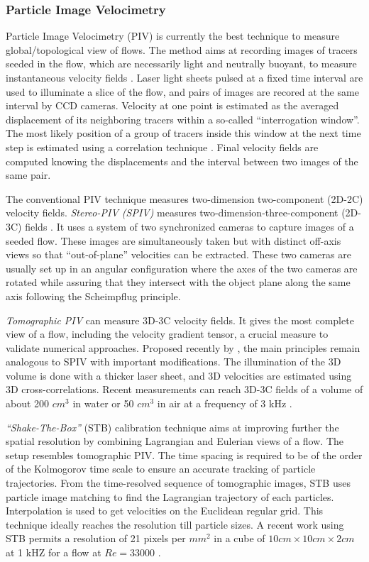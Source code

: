 \subsubsection{Particle Image Velocimetry}  
Particle Image Velocimetry (PIV) is currently the best technique to measure global/topological view of flows. The method aims at recording images of tracers seeded in the flow, which are necessarily light and neutrally buoyant, to measure instantaneous velocity fields \citep{adrian2005twenty,keane1992theory}. Laser light sheets pulsed at a fixed time interval are used to  illuminate a slice of the flow, and pairs of images are recored at the same interval by CCD cameras. Velocity at one point is estimated as the averaged displacement of its neighboring tracers within a so-called ``interrogation window''. The most likely position of a group of tracers inside this window at the next time step is estimated using a correlation technique \citep{sutton1983determination}. Final velocity fields are computed knowing the displacements and the interval between two images of the same pair.

The conventional PIV technique measures two-dimension two-component (2D-2C) velocity fields. \textit{Stereo-PIV (SPIV)} measures two-dimension-three-component (2D-3C) fields \citep{prasad2000stereoscopic}. It uses a system of two synchronized cameras to capture images of a seeded flow. These images are simultaneously taken but with distinct off-axis views so that ``out-of-plane'' velocities can be extracted. These two cameras are usually set up in an angular configuration where the axes of the two cameras are rotated while assuring that they intersect with the object plane along the same axis following the Scheimpflug principle.

\textit{Tomographic PIV} can measure 3D-3C velocity fields. It gives the most complete view of a flow, including the velocity gradient tensor, a crucial measure to validate numerical approaches. Proposed recently by \citet{elsinga2005assessment,elsinga2006tomographic}, the main principles remain analogous to SPIV with important modifications. The illumination of the 3D volume is done with a thicker laser sheet, and 3D velocities are estimated using 3D cross-correlations. Recent measurements can reach 3D-3C fields of a volume of about 200 $ cm^3 $ in water or 50 $ cm^3 $ in air at a frequency of 3 kHz \citep{scarano2013tomographic}. 

\textit{``Shake-The-Box''} (STB) calibration technique aims at improving further the spatial resolution by combining Lagrangian and Eulerian views of a flow. The setup resembles tomographic PIV. The time spacing is required to be of the order of the Kolmogorov time scale to ensure an accurate tracking of particle trajectories. From the time-resolved sequence of tomographic images, STB uses particle image matching to find the Lagrangian trajectory of each particles. Interpolation is used to get velocities on the Euclidean regular grid. This technique ideally reaches the resolution till particle sizes. A recent work using STB permits a resolution of 21 pixels per $ mm^2 $ in a cube of $ 10cm \times 10cm \times 2cm $ at 1 kHZ for a flow at $ Re = 33000$ \citep{schroder2015advances}.

